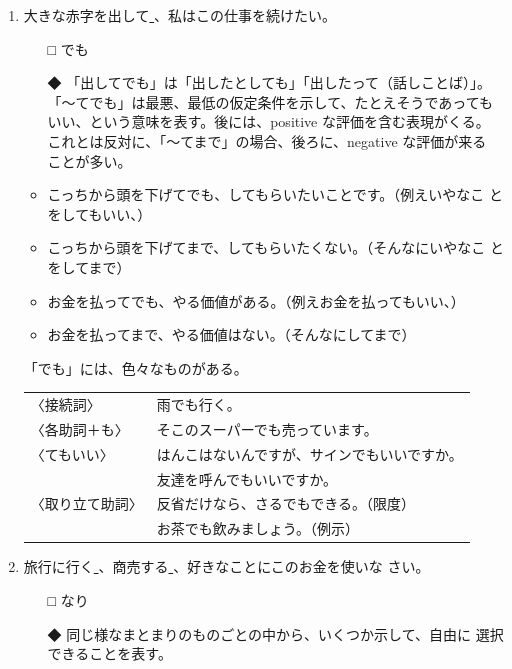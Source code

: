 \documentclass[
uplatex,
b5paper,
10pt,
dvipdfmx
]{jsbook}
\begin{document}
\begin{enumerate}
\item 大きな赤字を出して\underline{   }、私はこの仕事を続けたい。
\begin{itemize}
\item[□] でも
\item[◆] 「出してでも」は「出したとしても」「出したって（話しことば）」。
	  「〜てでも」は最悪、最低の仮定条件を示して、たとえそうであっても
	  いい、という意味を表す。後には、positive な評価を含む表現がくる。
	  これとは反対に、「〜てまで」の場合、後ろに、negative な評価が来る
	  ことが多い。 
\end{itemize}
\begin{itemize}
 \item こっちから頭を下げてでも、してもらいたいことです。（例えいやなこ
       とをしてもいい、）
 \item こっちから頭を下げてまで、してもらいたくない。（そんなにいやなこ
       とをしてまで）
 \item お金を払ってでも、やる価値がある。（例えお金を払ってもいい、）
 \item お金を払ってまで、やる価値はない。（そんなにしてまで）
\end{itemize}


「でも」には、色々なものがある。

\begin{tabular}[t]{ll}
〈接続詞〉      &雨でも行く。\\
〈各助詞＋も〉  &そこのスーパーでも売っています。\\
〈てもいい〉    &はんこはないんですが、サインでもいいですか。\\
                &友達を呼んでもいいですか。\\
〈取り立て助詞〉&反省だけなら、さるでもできる。（限度）\\
         &お茶でも飲みましょう。（例示） \\
\end{tabular}

\item 旅行に行く\underline{  }、商売する\underline{  }、好きなことにこのお金を使いな
      さい。

\begin{itemize}
\item[□] なり
\item[◆] 同じ様なまとまりのものごとの中から、いくつか示して、自由に
	  選択できることを表す。 
\end{itemize}


\end{enumerate}
\end{document}
